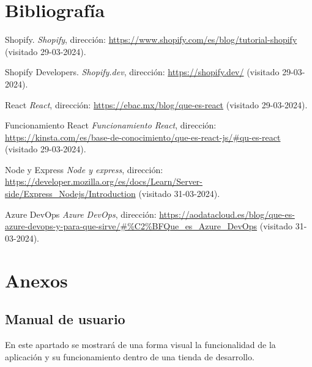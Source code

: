 \documentclass[12pt]{article}
\begin{document}
\section{Bibliografía}
\renewcommand{\refname}{}
\begin{thebibliography}{100} %
    
    Shopify. 
    \textit{Shopify}, dirección: \url{https://www.shopify.com/es/blog/tutorial-shopify} (visitado 29-03-2024).

    Shopify Developers. 
    \textit{Shopify.dev}, dirección: \url{https://shopify.dev/} (visitado 29-03-2024).

    React
    \textit{React}, dirección: \url{https://ebac.mx/blog/que-es-react} (visitado 29-03-2024).

    Funcionamiento React
    \textit{Funcionamiento React}, dirección: \url{https://kinsta.com/es/base-de-conocimiento/que-es-react-js/#qu-es-react} (visitado 29-03-2024).

    Node y Express
    \textit{Node y express}, dirección: \url{https://developer.mozilla.org/es/docs/Learn/Server-side/Express_Nodejs/Introduction} (visitado 31-03-2024).

    Azure DevOps
    \textit{Azure DevOps}, dirección: \url{https://aodatacloud.es/blog/que-es-azure-devops-y-para-que-sirve/#%C2%BFQue_es_Azure_DevOps} (visitado 31-03-2024).

\end{thebibliography}

\section{Anexos}

\subsection{Manual de usuario}
En este apartado se mostrará de una forma visual la funcionalidad de la aplicación y su funcionamiento dentro de una tienda de desarrollo.
\end{document}
